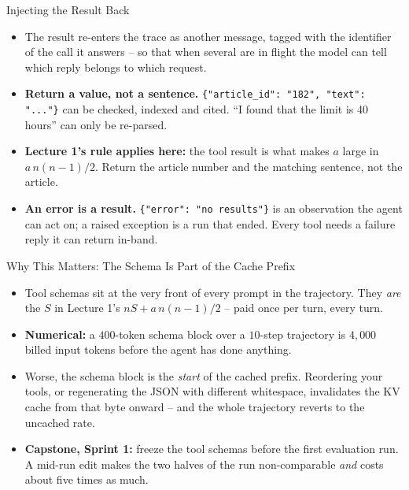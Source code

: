 \begin{frame}{Injecting the Result Back}
\begin{itemize}
  \item The result re-enters the trace as another message, tagged with the identifier of the call it answers -- so that when several are in flight the model can tell which reply belongs to which request.
  \pause
  \item \textbf{Return a value, not a sentence.} \texttt{\{"article\_id": "182", "text": "..."\}} can be checked, indexed and cited. ``I found that the limit is 40 hours'' can only be re-parsed.
  \pause
  \item \textbf{Lecture 1's rule applies here:} the tool result is what makes $a$ large in $a\,n(n-1)/2$. Return the article number and the matching sentence, not the article.
  \pause
  \item \textbf{An error is a result.} \texttt{\{"error": "no results"\}} is an observation the agent can act on; a raised exception is a run that ended. Every tool needs a failure reply it can return in-band.
\end{itemize}
\end{frame}

\begin{frame}{Why This Matters: The Schema Is Part of the Cache Prefix}
\begin{itemize}
  \item Tool schemas sit at the very front of every prompt in the trajectory. They \emph{are} the $S$ in Lecture 1's $nS + a\,n(n-1)/2$ -- paid once per turn, every turn.
  \pause
  \item \textbf{Numerical:} a $400$-token schema block over a $10$-step trajectory is $4{,}000$ billed input tokens before the agent has done anything.
  \pause
  \item Worse, the schema block is the \emph{start} of the cached prefix. Reordering your tools, or regenerating the JSON with different whitespace, invalidates the KV cache from that byte onward -- and the whole trajectory reverts to the uncached rate.
  \pause
  \item \textbf{Capstone, Sprint 1:} freeze the tool schemas before the first evaluation run. A mid-run edit makes the two halves of the run non-comparable \emph{and} costs about five times as much.
\end{itemize}
\end{frame}
